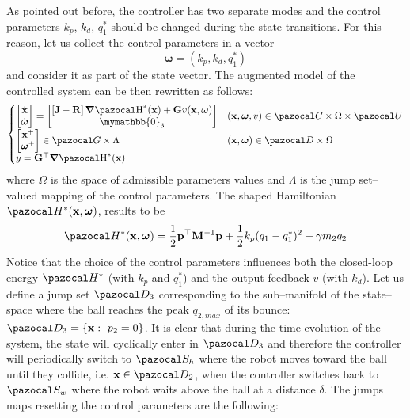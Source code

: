 %
As pointed out before, the controller has two separate modes and the control parameters $k_p$, $k_d$, $q_1^*$ should be changed during the state transitions.
% 
For this reason, let us collect the control parameters in a vector 
%
\begin{equation}
    \bm\omega = (k_p,k_d,q_1^*)
\end{equation}
%
and consider it as part of the state vector. The augmented model of the controlled system can be then rewritten as follows:
\begin{equation}\label{eq:HpHc}
    \left\{ 
        \begin{matrix*}[l]\vspace{1pt}
            \begin{bmatrix}\dot{\xb}\\\dot{\bm\omega}\end{bmatrix} = \begin{bmatrix}\left[\Jb-\Rb\right]{\dH^*(\xb)}+\Gb v(\x,\bm\omega)\\\mymathbb{0}_3\end{bmatrix} &(\xb,\bm\omega,v)\in\C\times\Omega\times\U\\
            \begin{bmatrix}{\xb}^+\\{\bm\omega}^+\end{bmatrix} \in \G\times\Lambda&(\xb,\bm\omega)\in\D\times\Omega\\
            y = \Gb^\top{\dH^*(\xb)}
        \end{matrix*}
    \right.
\end{equation}
%
where $\Omega$ is the space of admissible parameters values and $\Lambda$ is the jump set--valued mapping of the control parameters. The shaped Hamiltonian $\Ha^*(\xb,\bm\omega)$, results to be
\[\Ha^*(\xb,\bm\omega) = \frac{1}{2}\pb^\top \Mb^{-1}\pb + \frac{1}{2}k_p(q_1 - q_1^*)^2+ \gamma m_2q_2\]
Notice that the choice of the control parameters influences both the closed-loop energy $\Ha^*$ (with $k_p$ and $q_1^*$) and the output feedback $v$ (with $k_d$).
%
Let us define a jump set $\D_3$ corresponding to the sub--manifold of the state--space where the ball reaches the peak $q_{2,max}$ of its bounce: $\D_3 = \left\{\xb:~p_2=0\right\}$.
It is clear that during the time evolution of the system, the state will cyclically enter in $\D_3$ and therefore the controller will periodically switch to $\Sa_h$ where the robot moves toward the ball until they collide, i.e. $\xb\in\D_2$, when the controller switches back to $\Sa_w$ where the robot waits above the ball at a distance $\delta$. The jumps maps resetting the control parameters are the following:
